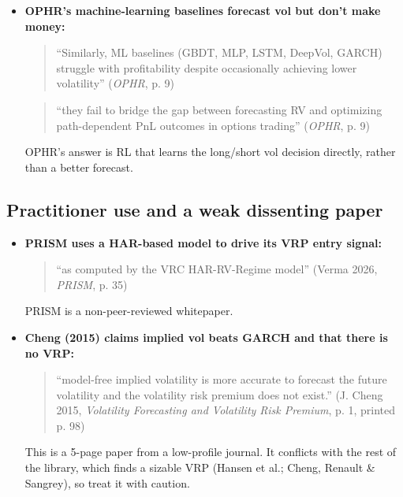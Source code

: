\documentclass{article}
\begin{document}
\begin{itemize}

\item \textbf{OPHR's machine-learning baselines forecast vol but don't make money:}

\begin{quote}``Similarly, ML baselines (GBDT, MLP, LSTM, DeepVol, GARCH) struggle with profitability despite occasionally achieving lower volatility'' (\emph{OPHR}, p. 9)\end{quote}

\begin{quote}``they fail to bridge the gap between forecasting RV and optimizing path-dependent PnL outcomes in options trading'' (\emph{OPHR}, p. 9)\end{quote}

OPHR's answer is RL that learns the long/\allowbreak{}short vol decision directly, rather than a better forecast.

\end{itemize}

\subsection{Practitioner use and a weak dissenting paper}

\begin{itemize}

\item \textbf{PRISM uses a HAR-based model to drive its VRP entry signal:}

\begin{quote}``as computed by the VRC HAR-RV-Regime model'' (Verma 2026, \emph{PRISM}, p. 35)\end{quote}

PRISM is a non-peer-reviewed whitepaper.

\item \textbf{Cheng (2015) claims implied vol beats GARCH and that there is no VRP:}

\begin{quote}``model-free implied volatility is more accurate to forecast the future volatility and the volatility risk premium does not exist.'' (J. Cheng 2015, \emph{Volatility Forecasting and Volatility Risk Premium}, p. 1, printed p. 98)\end{quote}

This is a 5-page paper from a low-profile journal. It conflicts with the rest of the library, which finds a sizable VRP (Hansen et al.; Cheng, Renault \& Sangrey), so treat it with caution.

\end{itemize}
\end{document}
